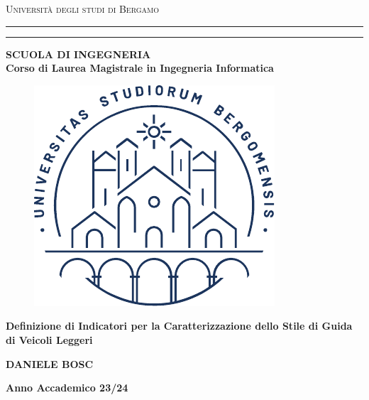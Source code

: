 \thispagestyle{empty}
\begin{titlepage}
\begin{center}
{{\Large{\textsc{Universit\`a degli studi di Bergamo}}}} \rule[0.1cm]{15.8cm}{0.1mm}
\rule[0.5cm]{15.8cm}{0.6mm}
{\small{\bf SCUOLA DI INGEGNERIA\\
Corso di Laurea Magistrale in Ingegneria Informatica}}
\end{center}

\vspace{8mm}
\begin{figure}[h]
    \centering
    \includegraphics{unibg_logo.pdf}
\end{figure}
\vspace{8mm}

\begin{center}
{\LARGE{\bf Definizione di Indicatori per la Caratterizzazione dello Stile di Guida di Veicoli Leggeri\\}}
\vspace{5mm}
\end{center}
\vspace{35mm}
\par
\noindent

\begin{center}
	{{\bf DANIELE BOSC}}
\end{center}
\vspace{15mm}
\begin{center}
{{\bf Anno Accademico 23/24}}
\end{center}    
\end{titlepage}